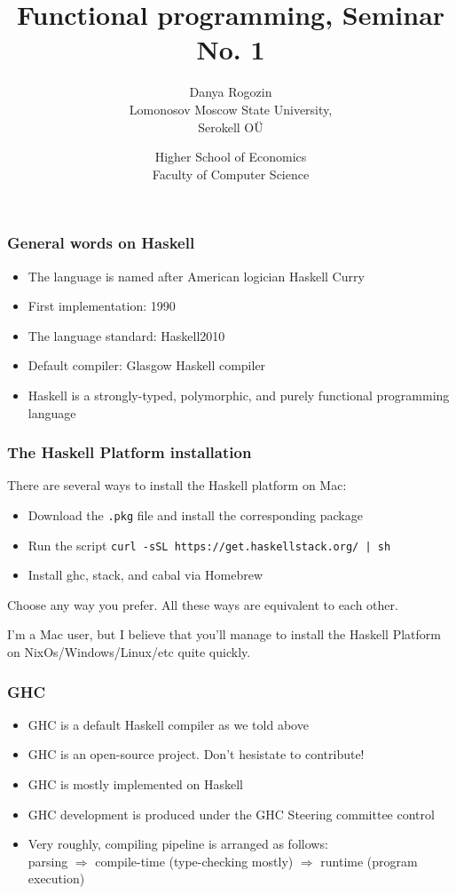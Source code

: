 \documentclass[10pt,pdf,utf8,russian,aspectratio=169]{beamer}
\title{Functional programming, Seminar No. 1}
\author{Danya Rogozin \\ Lomonosov Moscow State University, \\ Serokell O\"{U}}
\date{Higher School of Economics \\ Faculty of Computer Science}
\begin{document}
\maketitle

\begin{frame}
  \frametitle{General words on Haskell}

  \begin{itemize}
    \item The language is named after American logician Haskell Curry
    \item First implementation: 1990
    \item The language standard: Haskell2010
    \item Default compiler: Glasgow Haskell compiler
    \item Haskell is a strongly-typed, polymorphic, and purely functional programming language
  \end{itemize}
\end{frame}

\begin{frame}
  \frametitle{The Haskell Platform installation}

  There are several ways to install the Haskell platform on Mac:

  \begin{itemize}
    \item Download the \verb".pkg" file and install the corresponding package
    \item Run the script \verb"curl -sSL https://get.haskellstack.org/ | sh"
    \item Install ghc, stack, and cabal via Homebrew
  \end{itemize}

  Choose any way you prefer. All these ways are equivalent to each other.

  \vspace{\baselineskip}

 I'm a Mac user, but I believe that you'll manage to install the Haskell Platform on NixOs/Windows/Linux/etc quite quickly.
\end{frame}

\begin{frame}
  \frametitle{GHC}

  \begin{itemize}
    \item GHC is a default Haskell compiler as we told above
    \item GHC is an open-source project. Don't hesistate to contribute!
    \item GHC is mostly implemented on Haskell
    \item GHC development is produced under the GHC Steering committee control
    \item Very roughly, compiling pipeline is arranged as follows: \\ parsing $\Rightarrow$ compile-time (type-checking mostly)
    $\Rightarrow$ runtime (program execution)
  \end{itemize}
\end{frame}
\end{document}
